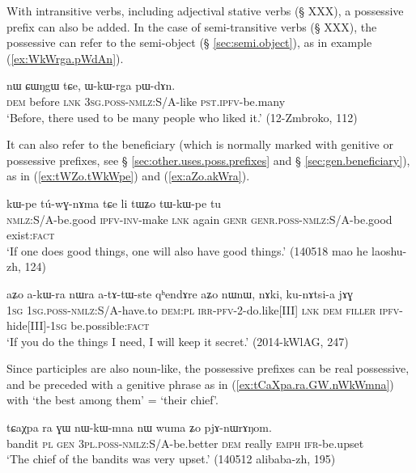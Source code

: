 With intransitive verbs, including adjectival stative verbs (§ XXX), a possessive prefix can also be added. In the case of semi-transitive verbs (§ XXX), the possessive can refer to the semi-object (§ \ref{sec:semi.object}), as in example (\ref{ex:WkWrga.pWdAn}).

 \begin{exe} 
\ex \label{ex:WkWrga.pWdAn}
\gll  nɯ ɕɯŋgɯ tɕe, ɯ-kɯ-rga pɯ-dɤn. \\
\textsc{dem} before \textsc{lnk} \textsc{3sg}.\textsc{poss}-\textsc{nmlz}:S/A-like \textsc{pst}.\textsc{ipfv}-be.many \\
\glt  `Before, there used to be many people who liked it.' (12-Zmbroko, 112)
\end{exe}

It can also refer to the beneficiary (which is normally marked with genitive or possessive prefixes, see § \ref{sec:other.uses.poss.prefixes} and § \ref{sec:gen.beneficiary}), as in (\ref{ex:tWZo.tWkWpe}) and (\ref{ex:aZo.akWra}).

 \begin{exe} 
\ex \label{ex:tWZo.tWkWpe}
\gll  kɯ-pe tú-wɣ-nɤma tɕe li tɯʑo tɯ-kɯ-pe tu \\
\textsc{nmlz}:S/A-be.good \textsc{ipfv}-\textsc{inv}-make \textsc{lnk} again \textsc{genr} \textsc{genr}.\textsc{poss}-\textsc{nmlz}:S/A-be.good exist:\textsc{fact} \\
\glt  `If one does good things, one will also have good things.' (140518 mao he laoshu-zh, 124)
\end{exe}

 \begin{exe} 
\ex \label{ex:aZo.akWra}
\gll  aʑo a-kɯ-ra nɯra a-tɤ-tɯ-ste qʰendɤre aʑo nɯnɯ, nɤki, ku-nɤtsi-a jɤɣ \\
\textsc{1sg} \textsc{1sg}.\textsc{poss}-\textsc{nmlz}:S/A-have.to \textsc{dem}:\textsc{pl} \textsc{irr}-\textsc{pfv}-2-do.like[III] \textsc{lnk} \textsc{dem} \textsc{filler} \textsc{ipfv}-hide[III]-\textsc{1sg} be.possible:\textsc{fact}  \\
\glt  `If you do the things I need, I will keep it secret.'  (2014-kWlAG, 247)
\end{exe}

Since participles are also noun-like, the possessive prefixes can be real possessive, and be preceded with a genitive phrase as in (\ref{ex:tCaXpa.ra.GW.nWkWmna}) with  `the best among them' = `their chief'.

 \begin{exe} 
\ex \label{ex:tCaXpa.ra.GW.nWkWmna}
\gll tɕaχpa ra ɣɯ nɯ-kɯ-mna nɯ wuma ʑo pjɤ-nɯrɤŋom. \\
bandit \textsc{pl} \textsc{gen} \textsc{3pl}.\textsc{poss}-\textsc{nmlz}:S/A-be.better \textsc{dem} really \textsc{emph} \textsc{ifr}-be.upset \\
\glt `The chief of the bandits was very upset.' (140512 alibaba-zh, 195)
\end{exe}

